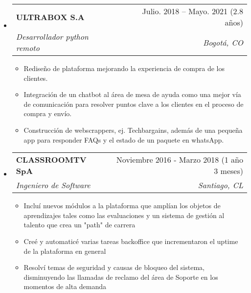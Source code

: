 \documentclass[letterpaper,12pt]{article}[leftmargin=*]
\makeatletter
\def \entryspacing {-0pt}
\renewcommand{\section}[2]{\vspace{5pt}
  \colorbox{secondary}{\color{white}\raggedbottom\normalsize\textbf{{#1}{\hspace{7pt}#2}}}
}
\newcommand{\resumeEntryStart}{\begin{itemize}[leftmargin=2.5mm]}
\newcommand{\resumeEntryEnd}{\end{itemize}\vspace{\entryspacing}}
\newcommand{\resumeItemListStart}{\begin{itemize}[leftmargin=4.5mm]}
\newcommand{\resumeItemListEnd}{\end{itemize}}
\newcommand{\resumeItem}[1]{
  \item\small{
    {#1 \vspace{-2pt}}
  }
}
\newcommand{\resumeEntryTSDL}[4]{
  \vspace{-1pt}\item[]
    \begin{tabularx}{0.97\textwidth}{X@{\hspace{60pt}}r}
      \textbf{\color{primary}#1} & {\firabook\color{accent}\small#2} \\
      \textit{\color{accent}\small#3} & \textit{\color{accent}\small#4} \\
    \end{tabularx}\vspace{-6pt}
}
\makeatother
\begin{document}
  \resumeEntryStart
    \resumeEntryTSDL
      {ULTRABOX S.A}{Julio. 2018 -- Mayo. 2021 (2.8 años)}
      {Desarrollador python remoto}{Bogotá, CO}
    \resumeItemListStart
    Empresa de transporte y nacionaliza productos a Colombia y a otros paises de latinoamerica. Integrado a e-commerces internacionales y a varios métodos de pago.

      \resumeItem {Rediseño de plataforma mejorando la experiencia de compra de los clientes.}
      \resumeItem {Integración de un chatbot al área de mesa de ayuda como una mejor vía de comunicación para resolver puntos clave a los clientes en el proceso de compra y envío.}
      \resumeItem {Construcción de webscrappers, ej. Techbargains, además de una pequeña app para responder FAQs y el estado de un paquete en whatsApp.}
    \resumeItemListEnd
  \resumeEntryEnd


  \resumeEntryStart
    \resumeEntryTSDL
      {CLASSROOMTV SpA}{Noviembre 2016 - Marzo 2018 (1 año 3 meses)}
      {Ingeniero de Software}{Santiago, CL}
    \resumeItemListStart
        Empresa E-learning, integrado con SENCE que provee cursos a la medida y con producción audiovisual

      \resumeItem {Incluí nuevos módulos a la plataforma que amplían los objetos de aprendizajes tales como las evaluaciones y un sistema de gestión al talento que crea un "path" de carrera}
      \resumeItem {Creé y automaticé varias tareas backoffice que incrementaron el uptime de la plataforma en general}
      \resumeItem {Resolví temas de seguridad y causas de bloqueo del sistema, disminuyendo las llamadas de reclamo del área de Soporte en los momentos de alta demanda}
    \resumeItemListEnd
  \resumeEntryEnd


\end{document}
